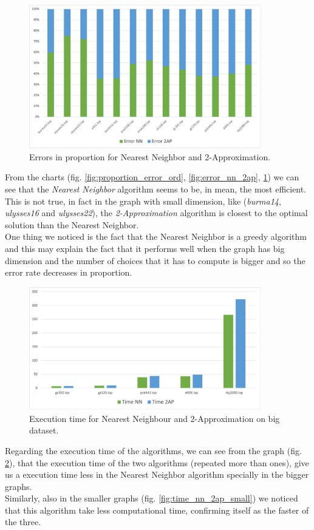 \begin{figure}[H]
    \centering
    \includegraphics[width=0.9\textwidth]{./img/error_nn_2ap_prop.png}
    \caption{Errors in proportion for Nearest Neighbor and 2-Approximation.}
    \label{fig:error_nn_2ap_prop}
\end{figure}
\noindent
From the charts (fig. \ref{fig:proportion_error_ord}, \ref{fig:error_nn_2ap}, \ref{fig:error_nn_2ap_prop}) we can see that the \textit{Nearest Neighbor} algorithm seems to be, in mean, the most efficient. This is not true, in fact in the graph with small dimension, like (\textit{burma14}, \textit{ulysses16} and \textit{ulysses22}), the \textit{2-Approximation} algorithm is closest to the optimal solution than the Nearest Neighbor.\\
One thing we noticed is the fact that the Nearest Neighbor is a greedy algorithm and this may explain the fact that it performs well when the graph has big dimension and the number of choices that it has to compute is bigger and so the error rate decreases in proportion.

\begin{figure}[H]
    \centering
    \includegraphics[width=0.9\textwidth]{./img/time_nn_2ap_big.png}
    \caption{Execution time for Nearest Neighbour and 2-Approximation on big dataset.}
    \label{fig:time_nn_2ap_big}
\end{figure}
\noindent
Regarding the execution time of the algorithms, we can see from the graph (fig. \ref{fig:time_nn_2ap_big}), that the execution time of the two algorithms (repeated more than ones), give us a execution time less in the Nearest Neighbor algorithm specially in the bigger graphs.\\
Similarly, also in the smaller graphs (fig. \ref{fig:time_nn_2ap_small}) we noticed that this algorithm take less computational time, confirming itself as the faster of the three.

